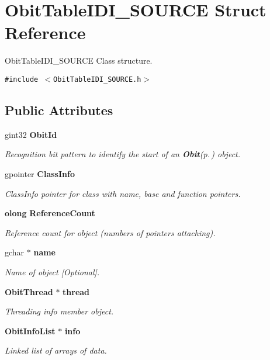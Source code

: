 \section{Obit\-Table\-IDI\_\-SOURCE Struct Reference}
\label{structObitTableIDI__SOURCE}
Obit\-Table\-IDI\_\-SOURCE Class structure.  


{\tt \#include $<$Obit\-Table\-IDI\_\-SOURCE.h$>$}

\subsection*{Public Attributes}
\begin{CompactItemize}
\item 
gint32 {\bf Obit\-Id}
\begin{CompactList}\small\item\em Recognition bit pattern to identify the start of an {\bf Obit}{\rm (p.\,\pageref{structObit})} object. \item\end{CompactList}\item 
gpointer {\bf Class\-Info}
\begin{CompactList}\small\item\em Class\-Info pointer for class with name, base and function pointers. \item\end{CompactList}\item 
{\bf olong} {\bf Reference\-Count}
\begin{CompactList}\small\item\em Reference count for object (numbers of pointers attaching). \item\end{CompactList}\item 
gchar $\ast$ {\bf name}
\begin{CompactList}\small\item\em Name of object [Optional]. \item\end{CompactList}\item 
{\bf Obit\-Thread} $\ast$ {\bf thread}
\begin{CompactList}\small\item\em Threading info member object. \item\end{CompactList}\item 
{\bf Obit\-Info\-List} $\ast$ {\bf info}
\begin{CompactList}\small\item\em Linked list of arrays of data. \item\end{CompactList}\item 

\end{CompactItemize}
